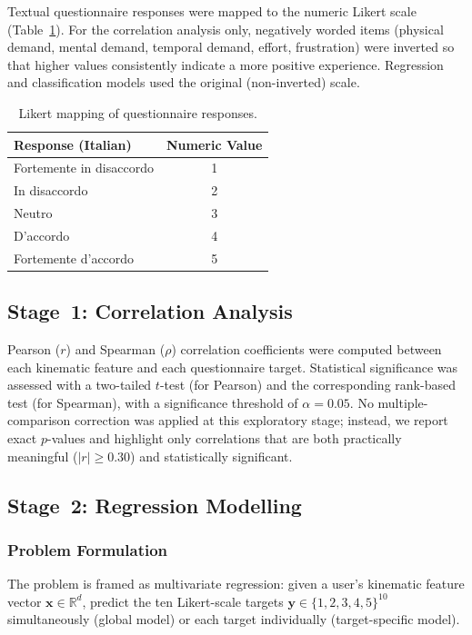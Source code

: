 Textual questionnaire responses were mapped to the numeric Likert scale (Table~\ref{tab:likert}). For the correlation analysis only, negatively worded items (physical demand, mental demand, temporal demand, effort, frustration) were inverted so that higher values consistently indicate a more positive experience. Regression and classification models used the original (non-inverted) scale.

\begin{table}[htbp]
\centering
\caption{Likert mapping of questionnaire responses.}
\label{tab:likert}
\begin{tabular}{lc}
\toprule
\textbf{Response (Italian)} & \textbf{Numeric Value} \\
\midrule
Fortemente in disaccordo & 1 \\
In disaccordo & 2 \\
Neutro & 3 \\
D'accordo & 4 \\
Fortemente d'accordo & 5 \\
\bottomrule
\end{tabular}
\end{table}

\subsection{Stage~1: Correlation Analysis}
\label{sec:corr_method}

Pearson ($r$) and Spearman ($\rho$) correlation coefficients were computed between each kinematic feature and each questionnaire target. Statistical significance was assessed with a two-tailed $t$-test (for Pearson) and the corresponding rank-based test (for Spearman), with a significance threshold of $\alpha = 0.05$. No multiple-comparison correction was applied at this exploratory stage; instead, we report exact $p$-values and highlight only correlations that are both practically meaningful ($|r| \ge 0.30$) and statistically significant.

\subsection{Stage~2: Regression Modelling}
\label{sec:reg_method}

\subsubsection{Problem Formulation}

The problem is framed as multivariate regression: given a user's kinematic feature vector $\mathbf{x} \in \mathbb{R}^{d}$, predict the ten Likert-scale targets $\mathbf{y} \in \{1,2,3,4,5\}^{10}$ simultaneously (global model) or each target individually (target-specific model).

